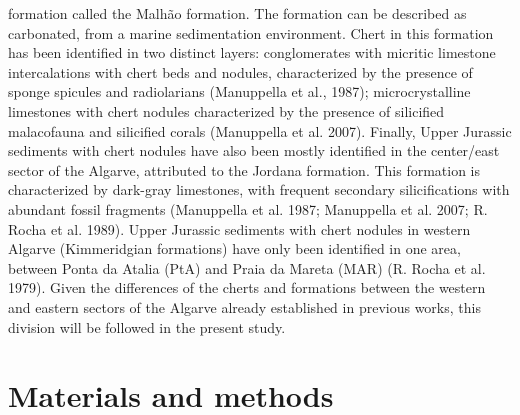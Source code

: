 \documentclass[
  a4paper,
  DIV=11,
  numbers=noendperiod]{scrreprt}
\begin{document}
formation called the Malhão formation. The formation can be described as
carbonated, from a marine sedimentation environment. Chert in this
formation has been identified in two distinct layers: conglomerates with
micritic limestone intercalations with chert beds and nodules,
characterized by the presence of sponge spicules and radiolarians
(Manuppella et al., 1987); microcrystalline limestones with chert
nodules characterized by the presence of silicified malacofauna and
silicified corals (Manuppella et al. 2007). Finally, Upper Jurassic
sediments with chert nodules have also been mostly identified in the
center/east sector of the Algarve, attributed to the Jordana formation.
This formation is characterized by dark-gray limestones, with frequent
secondary silicifications with abundant fossil fragments (Manuppella et
al. 1987; Manuppella et al. 2007; R. Rocha et al. 1989). Upper Jurassic
sediments with chert nodules in western Algarve (Kimmeridgian
formations) have only been identified in one area, between Ponta da
Atalia (PtA) and Praia da Mareta (MAR) (R. Rocha et al. 1979). Given the
differences of the cherts and formations between the western and eastern
sectors of the Algarve already established in previous works, this
division will be followed in the present study.

\section*{Materials and methods}\label{materials-and-methods}

\end{document}
